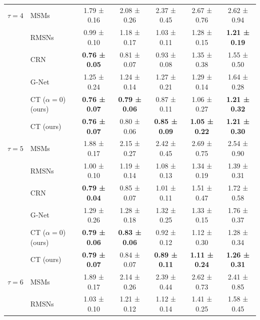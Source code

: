 \begin{tabular}{ll|ccccc}
\midrule
$\tau = 4$ & MSMs &           1.79 ± 0.16 &           2.08 ± 0.26 &           2.37 ± 0.45 &           2.67 ± 0.76 &           2.62 ± 0.94 \\
           & RMSNs &           0.99 ± 0.10 &           1.18 ± 0.17 &           1.03 ± 0.11 &           1.28 ± 0.15 &  \textbf{1.21 ± 0.19} \\
           & CRN &  \textbf{0.76 ± 0.05} &           0.81 ± 0.07 &           0.93 ± 0.08 &           1.35 ± 0.38 &           1.55 ± 0.50 \\
\vspace{0.9mm}
           & G-Net &           1.25 ± 0.24 &           1.24 ± 0.14 &           1.27 ± 0.21 &           1.29 ± 0.14 &           1.64 ± 0.28 \\
           & CT ($\alpha = 0$) (ours) &  \textbf{0.76 ± 0.07} &  \textbf{0.79 ± 0.06} &           0.87 ± 0.11 &           1.06 ± 0.27 &  \textbf{1.21 ± 0.32} \\
           & CT (ours) &  \textbf{0.76 ± 0.07} &           0.80 ± 0.06 &  \textbf{0.85 ± 0.09} &  \textbf{1.05 ± 0.22} &  \textbf{1.21 ± 0.30} \\
\midrule
$\tau = 5$ & MSMs &           1.88 ± 0.17 &           2.15 ± 0.27 &           2.42 ± 0.45 &           2.69 ± 0.75 &           2.54 ± 0.90 \\
           & RMSNs &           1.00 ± 0.10 &           1.19 ± 0.14 &           1.08 ± 0.13 &           1.34 ± 0.19 &           1.39 ± 0.31 \\
           & CRN &  \textbf{0.79 ± 0.04} &           0.85 ± 0.07 &           1.01 ± 0.11 &           1.51 ± 0.47 &           1.72 ± 0.58 \\
\vspace{0.9mm}
           & G-Net &           1.29 ± 0.26 &           1.28 ± 0.18 &           1.32 ± 0.25 &           1.33 ± 0.15 &           1.76 ± 0.37 \\
           & CT ($\alpha = 0$) (ours) &  \textbf{0.79 ± 0.06} &  \textbf{0.83 ± 0.06} &           0.92 ± 0.12 &           1.12 ± 0.30 &           1.28 ± 0.34 \\
           & CT (ours) &  \textbf{0.79 ± 0.07} &           0.84 ± 0.07 &  \textbf{0.89 ± 0.11} &  \textbf{1.11 ± 0.24} &  \textbf{1.26 ± 0.31} \\
\midrule
$\tau = 6$ & MSMs &           1.89 ± 0.17 &           2.14 ± 0.26 &           2.39 ± 0.44 &           2.62 ± 0.73 &           2.41 ± 0.85 \\
           & RMSNs &           1.03 ± 0.10 &           1.21 ± 0.12 &           1.12 ± 0.14 &           1.41 ± 0.25 &           1.58 ± 0.45 \\

\end{tabular}

